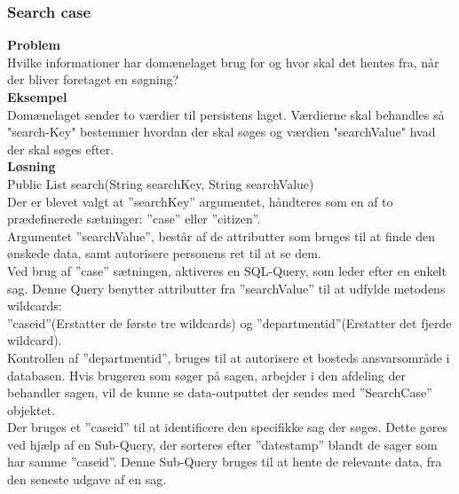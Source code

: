 \subsubsection{Search case}
\textbf{Problem} \\
Hvilke informationer har domænelaget brug for og hvor skal det hentes fra, når der bliver foretaget en søgning?\\
\textbf{Eksempel} \\
Domænelaget sender to værdier til persistens laget. Værdierne skal behandles så "search-Key" bestemmer hvordan der skal søges og værdien "searchValue" hvad der skal søges efter.\\
\textbf{Løsning} \\
Public List search(String searchKey, String searchValue)\\
Der er blevet valgt at ”searchKey” argumentet, håndteres som en af to prædefinerede sætninger: ”case” eller ”citizen”.\\
Argumentet ”searchValue”, består af de attributter som bruges til at finde den ønskede data, samt autorisere personens ret til at se dem.\\
Ved brug af ”case” sætningen, aktiveres en SQL-Query, som leder efter en enkelt sag. Denne Query benytter attributter fra ”searchValue” til at udfylde metodens wildcards:\\
”caseid”(Erstatter de første tre wildcards) og ”departmentid”(Erstatter det fjerde wildcard).\\
Kontrollen af ”departmentid”, bruges til at autorisere et bosteds ansvarsområde i databasen. Hvis brugeren som søger på sagen, arbejder i den afdeling der behandler sagen, vil de kunne se data-outputtet der sendes med ”SearchCase” objektet.\\
Der bruges et ”caseid” til at identificere den specifikke sag der søges. Dette gøres ved hjælp af en Sub-Query, der sorteres efter ”datestamp” blandt de sager som har samme ”caseid”. Denne Sub-Query bruges til at hente de relevante data, fra den seneste udgave af en sag.
